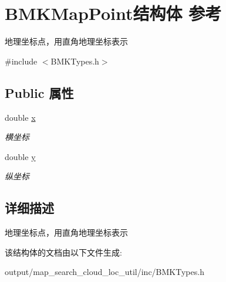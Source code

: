 \hypertarget{struct_b_m_k_map_point}{\section{B\+M\+K\+Map\+Point结构体 参考}
\label{struct_b_m_k_map_point}
}


地理坐标点，用直角地理坐标表示  




{\ttfamily \#include $<$B\+M\+K\+Types.\+h$>$}

\subsection*{Public 属性}
\begin{DoxyCompactItemize}
\item 
\hypertarget{struct_b_m_k_map_point_a8c0ca1c3f0cbb5fe183ae7745781d8fb}{double \hyperlink{struct_b_m_k_map_point_a8c0ca1c3f0cbb5fe183ae7745781d8fb}{x}}\label{struct_b_m_k_map_point_a8c0ca1c3f0cbb5fe183ae7745781d8fb}

\begin{DoxyCompactList}\small\item\em 横坐标 \end{DoxyCompactList}\item 
\hypertarget{struct_b_m_k_map_point_a9d0aff0bad009459af85d1e51a194341}{double \hyperlink{struct_b_m_k_map_point_a9d0aff0bad009459af85d1e51a194341}{y}}\label{struct_b_m_k_map_point_a9d0aff0bad009459af85d1e51a194341}

\begin{DoxyCompactList}\small\item\em 纵坐标 \end{DoxyCompactList}\end{DoxyCompactItemize}


\subsection{详细描述}
地理坐标点，用直角地理坐标表示 

该结构体的文档由以下文件生成\+:\begin{DoxyCompactItemize}
\item 
output/map\+\_\+search\+\_\+cloud\+\_\+loc\+\_\+util/inc/B\+M\+K\+Types.\+h\end{DoxyCompactItemize}
